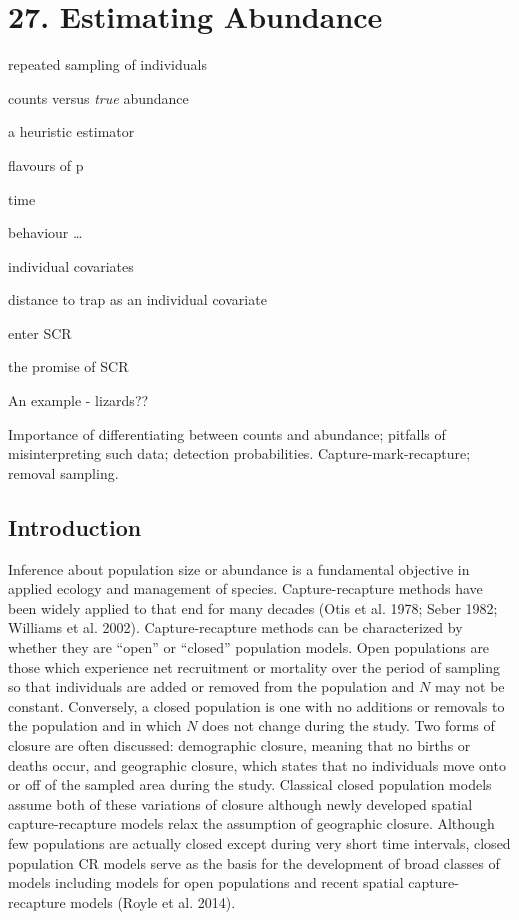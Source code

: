 \documentclass{book}
\begin{document}
\chapter*{27. Estimating Abundance\\
          }
\begin{itemize}
\item{repeated sampling of individuals}
\item{counts versus \emph{true} abundance}
\item{a heuristic estimator}
\item{flavours of p
  \item{time}
  \item{behaviour}
  \ldots
  \item{individual covariates}
}
\item{distance to trap as an individual covariate}
\item{enter SCR}
\item{the promise of SCR}
\item{An example - lizards??}


\end{itemize}
Importance of differentiating between counts and abundance; pitfalls of misinterpreting such data; detection probabilities. Capture-mark-recapture; removal sampling.


\section{Introduction}

Inference about population size or abundance is a fundamental
objective in applied ecology and management of species.
Capture-recapture methods have been widely applied to that end for
many decades (Otis et al. 1978; Seber 1982; Williams et al. 2002).
Capture-recapture methods can be characterized by whether they are
``open'' or ``closed'' population models.  Open populations are those
which experience net recruitment or mortality over the period of
sampling so that individuals are added or removed from the population
and $N$ may not be constant. Conversely, a closed population is one
with no additions or removals to the population and in which $N$ does
not change during the study.  Two forms of closure are often
discussed: demographic closure, meaning that no births or deaths
occur, and geographic closure, which states that no individuals move
onto or off of the sampled area during the study.  Classical closed
population models assume both of these variations of closure although
newly developed spatial capture-recapture models relax the assumption
of geographic closure.  Although few populations are actually closed
except during very short time intervals, closed population CR models
serve as the basis for the development of broad classes of models
including models for open populations and recent spatial
capture-recapture models (Royle et al. 2014).
\end{document}
